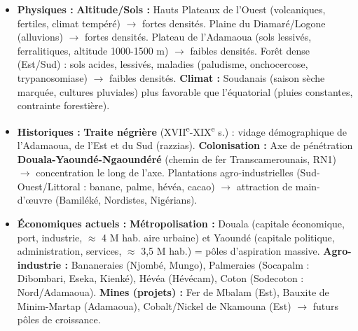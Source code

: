 \documentclass[11pt]{article}
\newcommand{\cle}[1]{{\popxbold\color{popdark}#1}}
\begin{document}
\begin{aretenir}
\begin{itemize}
    \item \textbf{Physiques :} \textbf{Altitude/Sols :} Hauts Plateaux de l'Ouest (volcaniques, fertiles, climat tempéré) $\to$ fortes densités. Plaine du Diamaré/Logone (alluvions) $\to$ fortes densités. Plateau de l'Adamaoua (sols lessivés, ferralitiques, altitude 1000-1500 m) $\to$ faibles densités. Forêt dense (Est/Sud) : sols acides, lessivés, maladies (paludisme, onchocercose, trypanosomiase) $\to$ faibles densités. \textbf{Climat :} Soudanais (saison sèche marquée, cultures pluviales) plus favorable que l'équatorial (pluies constantes, contrainte forestière).
    \item \textbf{Historiques :} \textbf{Traite négrière} (XVII\textsuperscript{e}-XIX\textsuperscript{e} s.) : vidage démographique de l'Adamaoua, de l'Est et du Sud (razzias). \textbf{Colonisation :} Axe de pénétration \textbf{Douala-Yaoundé-Ngaoundéré} (chemin de fer Transcamerounais, RN1) $\to$ concentration le long de l'axe. Plantations agro-industrielles (Sud-Ouest/Littoral : banane, palme, hévéa, cacao) $\to$ attraction de main-d'œuvre (Bamiléké, Nordistes, Nigérians).
    \item \textbf{Économiques actuels :} \textbf{Métropolisation :} \cle{Douala} (capitale économique, port, industrie, $\approx$ 4 M hab. aire urbaine) et \cle{Yaoundé} (capitale politique, administration, services, $\approx$ 3,5 M hab.) = pôles d'aspiration massive. \textbf{Agro-industrie :} Bananeraies (Njombé, Mungo), Palmeraies (Socapalm : Dibombari, Eseka, Kienké), Hévéa (Hévécam), Coton (Sodecoton : Nord/Adamaoua). \textbf{Mines (projets) :} Fer de \cle{Mbalam} (Est), Bauxite de \cle{Minim-Martap} (Adamaoua), Cobalt/Nickel de \cle{Nkamouna} (Est) $\to$ futurs pôles de croissance.
\end{itemize}
\end{aretenir}
\end{document}
